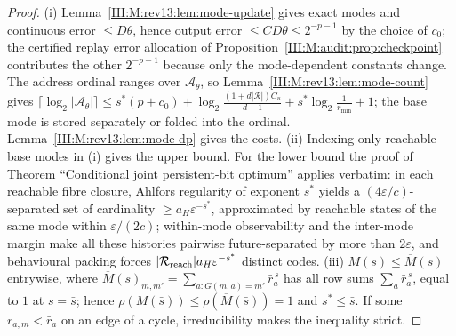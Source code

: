 \begin{proof}
(i) Lemma~\ref{III:M:rev13:lem:mode-update} gives exact modes and continuous error $\le D\theta$,
hence output error $\le CD\theta\le2^{-p-1}$ by the choice of $c_0$; the certified
replay error allocation of Proposition~\ref{III:M:audit:prop:checkpoint} contributes the other
$2^{-p-1}$ because only the mode-dependent constants change. The address ordinal ranges over
$\mathcal A_\theta$, so Lemma~\ref{III:M:rev13:lem:mode-count} gives
$\lceil\log_2|\mathcal A_\theta|\rceil\le s^\ast(p+c_0)+\log_2\frac{(1+d|\mathcal R|)C_u}{d-1}
+s^\ast\log_2\frac1{r_{\min}}+1$; the base mode is stored separately or folded into the
ordinal. Lemma~\ref{III:M:rev13:lem:mode-dp} gives the costs.
(ii) Indexing only reachable base modes in (i) gives the upper bound. For the lower bound
the proof of Theorem ``Conditional joint persistent-bit optimum'' applies verbatim: in
each reachable fibre closure, Ahlfors regularity of exponent $s^\ast$ yields a
$(4\varepsilon/c)$-separated set of cardinality $\ge a_H\varepsilon^{-s^\ast}$, approximated
by reachable states of the same mode within $\varepsilon/(2c)$; within-mode observability
and the inter-mode margin make all these histories pairwise future-separated by more than
$2\varepsilon$, and behavioural packing forces $|\mathcal R_{\rm reach}|a_H\varepsilon^{-s^\ast}$
distinct codes.
(iii) $M(s)\le\overline M(s)$ entrywise, where
$\overline M(s)_{m,m'}=\sum_{a:G(m,a)=m'}\bar r_a^{\,s}$ has all row sums
$\sum_a\bar r_a^{\,s}$, equal to $1$ at $s=\bar s$; hence
$\rho(M(\bar s))\le\rho(\overline M(\bar s))=1$ and $s^\ast\le\bar s$. If some
$r_{a,m}<\bar r_a$ on an edge of a cycle, irreducibility makes the inequality strict.
\end{proof}
